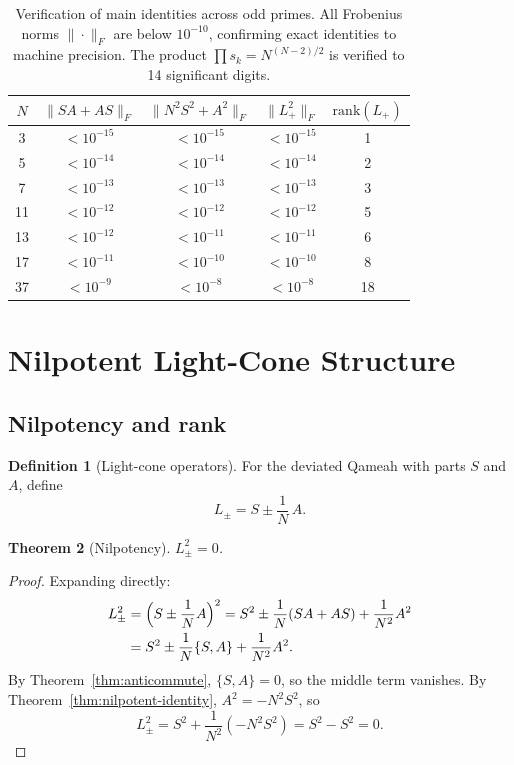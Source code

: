 \documentclass[aip,jmp,reprint,superscriptaddress,floatfix,nofootinbib]{revtex4-2}
\newtheorem{theorem}{Theorem}
\theoremstyle{definition}
\newtheorem{definition}[theorem]{Definition}
\theoremstyle{remark}
\begin{document}
\begin{table}[ht]
\centering
\caption{Verification of main identities across odd primes.  All
Frobenius norms $\|{\cdot}\|_F$ are below $10^{-10}$, confirming
exact identities to machine precision.  The product
$\prod s_k = N^{(N-2)/2}$ is verified to 14 significant digits.}
\label{tab:verification}
\begin{tabular}{ccccc}
\toprule
$N$ & $\|SA{+}AS\|_F$ & $\|N^2S^2{+}A^2\|_F$ & $\|L_+^2\|_F$ &
$\mathrm{rank}(L_+)$ \\
\midrule
3  & $<10^{-15}$ & $<10^{-15}$ & $<10^{-15}$ & 1 \\
5  & $<10^{-14}$ & $<10^{-14}$ & $<10^{-14}$ & 2 \\
7  & $<10^{-13}$ & $<10^{-13}$ & $<10^{-13}$ & 3 \\
11 & $<10^{-12}$ & $<10^{-12}$ & $<10^{-12}$ & 5 \\
13 & $<10^{-12}$ & $<10^{-11}$ & $<10^{-11}$ & 6 \\
17 & $<10^{-11}$ & $<10^{-10}$ & $<10^{-10}$ & 8 \\
37 & $<10^{-9}$  & $<10^{-8}$  & $<10^{-8}$  & 18 \\
\bottomrule
\end{tabular}
\end{table}

\section{Nilpotent Light-Cone Structure}
\label{sec:nilpotent}

\subsection{Nilpotency and rank}

\begin{definition}[Light-cone operators]
\label{def:lightcone}
For the deviated Qameah with parts $S$ and $A$, define
\begin{equation}\label{eq:lpm}
  L_{\pm} = S \pm \frac{1}{N}\,A.
\end{equation}
\end{definition}

\begin{theorem}[Nilpotency]
\label{thm:nilpotent}
$L_{\pm}^2 = 0$.
\end{theorem}

\begin{proof}
Expanding directly:
\begin{align}
  L_{\pm}^2
  &= \Bigl(S \pm \frac{1}{N}A\Bigr)^2
   = S^2 \pm \frac{1}{N}(SA + AS) + \frac{1}{N^2}A^2 \notag \\
  &= S^2 \pm \frac{1}{N}\{S,A\} + \frac{1}{N^2}A^2.
  \label{eq:lpm-expand}
\end{align}
By Theorem~\ref{thm:anticommute}, $\{S,A\} = 0$, so the middle term
vanishes.  By Theorem~\ref{thm:nilpotent-identity},
$A^2 = -N^2 S^2$, so
\[
  L_{\pm}^2 = S^2 + \frac{1}{N^2}(-N^2 S^2) = S^2 - S^2 = 0.
\]
\end{proof}
\end{document}
